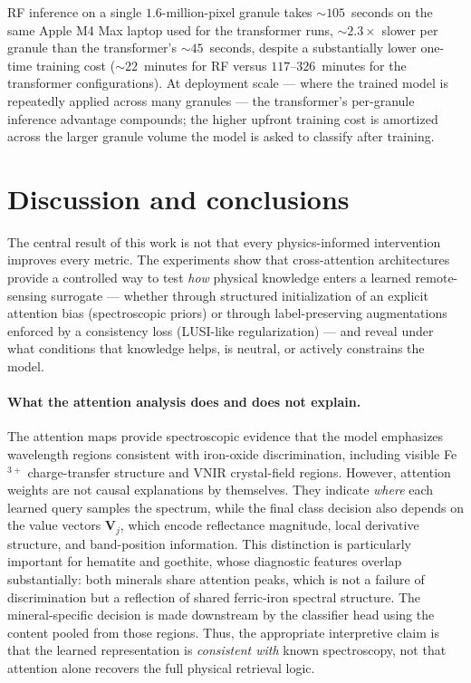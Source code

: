 \documentclass[preprint,12pt]{elsarticle}
\begin{document}
RF inference on a single $1.6$-million-pixel granule takes $\sim$$105$~seconds on the same Apple M4 Max laptop used for the transformer runs, $\sim$$2.3\times$ slower per granule than the transformer's $\sim$$45$~seconds, despite a substantially lower one-time training cost ($\sim$$22$~minutes for RF versus $117$--$326$~minutes for the transformer configurations). At deployment scale --- where the trained model is repeatedly applied across many granules --- the transformer's per-granule inference advantage compounds; the higher upfront training cost is amortized across the larger granule volume the model is asked to classify after training.

\section{Discussion and conclusions}
\label{sec:conclusions}

The central result of this work is not that every physics-informed intervention improves every metric.
The experiments show that cross-attention architectures provide a controlled way to test \emph{how} physical knowledge enters a learned remote-sensing surrogate --- whether through structured initialization of an explicit attention bias (spectroscopic priors) or through label-preserving augmentations enforced by a consistency loss (LUSI-like regularization) --- and reveal under what conditions that knowledge helps, is neutral, or actively constrains the model.

\paragraph{What the attention analysis does and does not explain.}
The attention maps provide spectroscopic evidence that the model emphasizes wavelength regions consistent with iron-oxide discrimination, including visible Fe$^{3+}$ charge-transfer structure and VNIR crystal-field regions.
However, attention weights are not causal explanations by themselves.
They indicate \emph{where} each learned query samples the spectrum, while the final class decision also depends on the value vectors $\mathbf{V}_j$, which encode reflectance magnitude, local derivative structure, and band-position information.
This distinction is particularly important for hematite and goethite, whose diagnostic features overlap substantially: both minerals share attention peaks, which is not a failure of discrimination but a reflection of shared ferric-iron spectral structure.
The mineral-specific decision is made downstream by the classifier head using the content pooled from those regions.
Thus, the appropriate interpretive claim is that the learned representation is \emph{consistent with} known spectroscopy, not that attention alone recovers the full physical retrieval logic.
\end{document}
